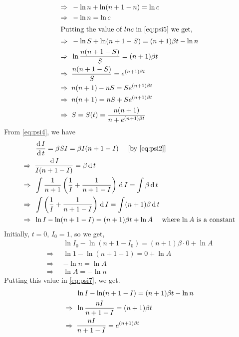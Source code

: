 \documentclass[../main-sheet.tex]{subfiles}
\begin{document}
\begin{soln}
\begin{align}
        \Rightarrow\;\;& -\ln n+\ln({n+1-n})=\ln c\notag\\
        \Rightarrow\;\;& -\ln n=\ln c\notag\\
        \intertext{Putting the value of \(ln c\) in \eqref{eq:psi5} we get,}
        \Rightarrow\;\;& -\ln{S}+\ln({n+1-S})=(n+1)\beta t-\ln n\notag\\
        \Rightarrow\;\;& \ln\frac{n(n+1-S)}{S}=(n+1)\beta t\notag\\
        \Rightarrow\;\;& \frac{n(n+1-S)}{S}=e^{(n+1)\beta t}\notag\\
        \Rightarrow\;\;& {n(n+1)-nS}=Se^{(n+1)\beta t}\notag\\
        \Rightarrow\;\;& {n(n+1)}=nS+Se^{(n+1)\beta t}\notag\\
        \Rightarrow\;\;& S=S(t)=\frac{n(n+1)}{n+e^{(n+1)\beta t}}\label{eq:psi6}
    \end{align}
    From \eqref{eq:psi4}, we have
    \begin{align}
        &\,\frac{\mathrm{d}\,I}{\mathrm{d}\,t}=\beta SI=\beta I(n+1-I)\quad \text{ [by \eqref{eq:psi2}]}\notag\\
        \Rightarrow\;\;&\frac{\,\mathrm{d}\, I}{I(n+1-I)}=\beta \,\mathrm{d}\, t\notag\\
        \Rightarrow\;\;&\int\frac{1}{n+1}\left( \frac{1}{I}+\frac{1}{n+1-I} \right)\,\mathrm{d}\, I=\int \beta \,\mathrm{d}\, t\notag\\
        \Rightarrow\;\;&\int\left( \frac{1}{I}+\frac{1}{n+1-I} \right)\,\mathrm{d}\, I=\int(n+1) \beta \,\mathrm{d}\, t\notag\\
        \Rightarrow\;\;&\ln {I}-\ln ({n+1-I}) =(n+1) \beta t+\ln A\label{eq:psi7}\quad\text{ where \(\ln A\) is a constant}
    \end{align}
    Initially, \(t=0\), \(I_0=1\), so we get,
    \begin{align*}
        &\ln {I_0}-\ln ({n+1-I_0}) =(n+1) \beta \cdot 0+\ln A\\
        \Rightarrow\;\;&\ln 1-\ln ({n+1-1}) =0+\ln A\\
        \Rightarrow\;\;&-\ln n =\ln A\\
        \Rightarrow\;\;&\ln A =-\ln n
    \end{align*}
    Putting this value in \eqref{eq:psi7}, we get.
    \begin{align}
        &\ln {I}-\ln ({n+1-I}) =(n+1) \beta t-\ln n\notag\\
        \Rightarrow\;\;&\ln \frac{nI}{n+1-I}=(n+1) \beta t\notag\\
        \Rightarrow\;\;&\frac{nI}{n+1-I}=e^{(n+1) \beta t}\notag\\

\end{align}
\end{soln}
\end{document}
